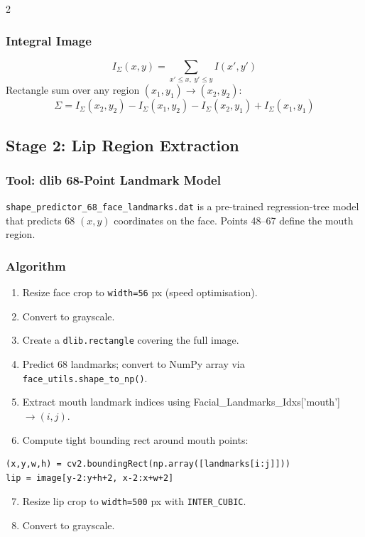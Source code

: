 \documentclass[10pt, a4paper]{article}
\begin{document}
\begin{multicols}{2}
\subsubsection{Integral Image}
\begin{equation}
I_\Sigma(x,y) = \sum_{x' \leq x,\; y' \leq y} I(x', y')
\end{equation}
Rectangle sum over any region $(x_1,y_1)\to(x_2,y_2)$:
\begin{equation}
\Sigma = I_\Sigma(x_2,y_2) - I_\Sigma(x_1,y_2)
       - I_\Sigma(x_2,y_1) + I_\Sigma(x_1,y_1)
\end{equation}

\subsection{Stage 2: Lip Region Extraction}

\subsubsection{Tool: dlib 68-Point Landmark Model}
\texttt{shape\_predictor\_68\_face\_landmarks.dat} is a pre-trained
regression-tree model that predicts 68 $(x, y)$ coordinates on the face.
Points 48--67 define the mouth region.

\subsubsection{Algorithm}
\begin{enumerate}
  \item Resize face crop to \texttt{width=56} px (speed optimisation).
  \item Convert to grayscale.
  \item Create a \texttt{dlib.rectangle} covering the full image.
  \item Predict 68 landmarks; convert to NumPy array via
        \texttt{face\_utils.shape\_to\_np()}.
  \item Extract mouth landmark indices using
        Facial\_Landmarks\_Idxs['mouth'] $\to (i, j)$.
  \item Compute tight bounding rect around mouth points:
\end{enumerate}
\begin{codebox}
\footnotesize
\begin{verbatim}
(x,y,w,h) = cv2.boundingRect(np.array([landmarks[i:j]]))
lip = image[y-2:y+h+2, x-2:x+w+2]
\end{verbatim}
\end{codebox}
\begin{enumerate}
  \setcounter{enumi}{6}
  \item Resize lip crop to \texttt{width=500} px with \texttt{INTER\_CUBIC}.
  \item Convert to grayscale.
\end{enumerate}


\end{multicols}
\end{document}
